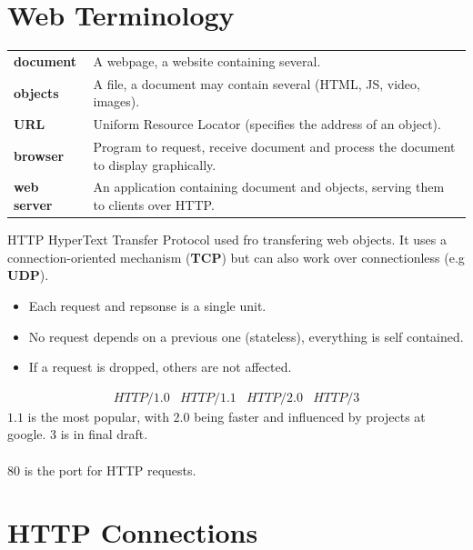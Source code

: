 \section{Web Terminology}
\begin{center}
    \begin{tabular}{l p{}}
        \textbf{document}   & A webpage, a website containing several.                                              \\
        \textbf{objects}    & A file, a document may contain several (HTML, JS, video, images).                     \\
        \textbf{URL}        & Uniform Resource Locator (specifies the address of an object).                        \\
        \textbf{browser}    & Program to request, receive document and process the document to display graphically. \\
        \textbf{web server} & An application containing document and objects, serving them to clients over HTTP.    \\
    \end{tabular}
\end{center}
\begin{definitionbox}{HTTP}
    HyperText Transfer Protocol used fro transfering web objects. It uses a connection-oriented mechanism (\textbf{TCP}) but can also work over connectionless (e.g \textbf{UDP}).
    \begin{itemize}
        \setlength\itemsep{0em}
        \item Each request and repsonse is a single unit.
        \item No request depends on a previous one (stateless), everything is self contained.
        \item If a request is dropped, others are not affected.
    \end{itemize}
    \[\begin{matrix}
            HTTP/1.0 & HTTP/1.1 & HTTP/2.0 & HTTP/3
        \end{matrix}\]
    $1.1$ is the most popular, with $2.0$ being faster and influenced by projects at google. $3$ is in final draft.
    \\
    \\ $80$ is the port for HTTP requests.
\end{definitionbox}
\section{HTTP Connections}
